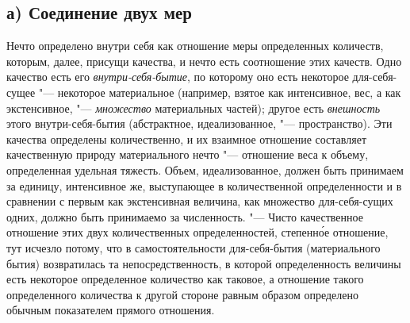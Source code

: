 \subsection[а) Соединение двух мер]{а) Соединение двух мер}
Нечто определено внутри себя как отношение меры
определенных количеств, которым, далее, присущи качества, и нечто есть
соотношение этих качеств. Одно качество есть его
{\em внутри-себя-бытие}, по которому оно есть некоторое
для-себя-сущее "--- некоторое материальное (например, взятое как интенсивное,
вес, а как экстенсивное, "--- {\em множество} материальных
частей); другое есть {\em внешность} этого
внутри-себя-бытия (абстрактное, идеализованное, "--- пространство). Эти
качества определены количественно, и их взаимное отношение составляет
качественную природу материального нечто "--- отношение веса к объему,
определенная удельная тяжесть. Объем, идеализованное, должен быть принимаем
за единицу, интенсивное же, выступающее в количественной определенности и в
сравнении с первым как экстенсивная величина, как множество для-себя-сущих
одних, должно быть принимаемо за численность. "--- Чисто качественное
отношение этих двух количественных определенностей, степенн\'{о}е отношение,
тут исчезло потому, что в самостоятельности для-себя-бытия (материального
бытия) возвратилась та непосредственность, в которой определенность
величины есть некоторое определенное количество как таковое, а отношение
такого определенного количества к другой стороне равным образом определено
обычным показателем прямого отношения.

